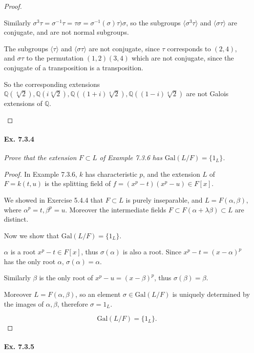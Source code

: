 \documentclass[11pt,a4paper]{article}
\newcommand{\Q}{\mathbb{Q}}
\newcommand{\Gal}{\mathrm{Gal}}
\begin{document}
\begin{proof}
\begin{enumerate}
 
Similarly $\sigma^3 \tau = \sigma^{-1} \tau = \tau \sigma = \sigma^{-1}(\sigma) \tau) \sigma$, so the subgroups $\langle \sigma^3 \tau \rangle$ and $\langle \sigma \tau \rangle$ are conjugate, and are not normal subgroups.
 
The subgroups $\langle \tau \rangle$ and $\langle \sigma \tau \rangle$ are not conjugate, since $\tau$ corresponds to $(2,4)$, and $\sigma \tau$ to the permutation $(1,2)(3,4)$ which are not conjugate, since the conjugate of a transposition is a transposition.
 
So the corresponding extensions  $\Q(\sqrt[4]{2}), \Q(i\sqrt[4]{2}), \Q((1+i)\sqrt[4]{2}), \Q((1-i)\sqrt[4]{2})$ are not Galois extensions of $\Q$.
 
\end{enumerate}
\end{proof}

\paragraph{Ex. 7.3.4}

{\it  Prove that the extension $F\subset L$ of Example 7.3.6 has $\Gal(L/F) = \{1_L\}$.
}

\begin{proof}
In Example 7.3.6, $k$ has characteristic $p$, and the extension $L$ of $F = k(t,u)$ is the splitting field of $f =(x^p - t)(x^p-u) \in F[x]$.

We showed in Exercise 5.4.4 that $F \subset L$ is purely inseparable, and $L=F(\alpha,\beta)$, where $\alpha^p = t, \beta^p=u$.
Moreover the intermediate fields $F \subset F(\alpha+\lambda \beta) \subset L$ are distinct.

Now we show that $\Gal(L/F) = \{1_L\}$.

$\alpha$ is a root $x^p -t \in F[x]$, thus $\sigma(\alpha)$ is also a root. Since $x^p - t = (x-\alpha)^p$ has the only root $\alpha$, $\sigma(\alpha) = \alpha$.

Similarly $\beta$ is the only root of $x^p - u =(x-\beta)^p$, thus $\sigma(\beta) = \beta$.

Moreover $L = F(\alpha,\beta)$, so an element $\sigma \in \Gal(L/F)$ is uniquely determined by the images of $\alpha,\beta$, therefore $\sigma = 1_L$.

$$\Gal(L/F) = \{1_L\}.$$
\end{proof}

\paragraph{Ex. 7.3.5}
\end{document}
